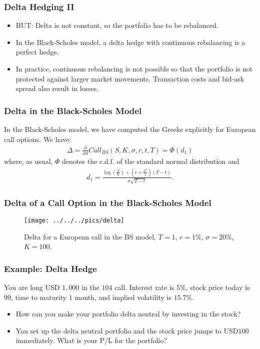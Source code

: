 \begin{frame}[fragile]
\frametitle{Delta Hedging II}
\begin{itemize}
  \item BUT: Delta is not constant, so the portfolio has to be rebalanced.
  \item In the Black-Scholes model, a delta hedge with continuous rebalancing is
  a perfect hedge.
  \item In practice, continuous rebalancing is not possible so that the
  portfolio is not protected against larger market movements. Transaction
  costs and bid-ask spread also result in losses.
\end{itemize}
\end{frame}



\begin{frame}[fragile]
\frametitle{Delta in the Black-Scholes Model}
In the Black-Scholes model, we have computed the Greeks explicitly for
European call options. We have:
\begin{align*}
  \Delta = \frac{\partial}{\partial S}Call_{BS}(S,K,\sigma,r,t,T) = \Phi(d_1)
\end{align*}
where, as usual, $\Phi$ denotes the c.d.f. of the standard normal distribution and
\begin{align*}
  d_1 = \frac{\log \left( \frac{S}{K} \right) + \left( r + \frac{\sigma^2}{2}
  \right)(T-t)}{\sigma \sqrt{T-t}}.
\end{align*}
\end{frame}

\begin{frame}[fragile]
\frametitle{Delta of a Call Option in the Black-Scholes Model}
\begin{figure}[htp]
\begin{center}
  \texttt{[image: ../../../pics/delta]}
  \caption{Delta for a European call in the BS model, $T=1$, $r=1\%$,
  $\sigma=20\%$, $K=100$.}
  \label{fig:deltaBS}
\end{center}
\end{figure}
\end{frame}

\begin{frame}[fragile]
\frametitle{Example: Delta Hedge}
You are long USD $1,000$ in the $104$ call. Interest rate is $5\%$,
stock price today is $99$, time to maturity $1$ month, and implied volatility is
$15.7\%$.
\begin{itemize}
  \item How can you make your portfolio delta neutral by investing in the stock?
  \item You set up the delta neutral portfolio and the stock price jumps to
  USD$100$ immediately. What is your P/L for the portfolio?
\end{itemize}

\end{frame}

